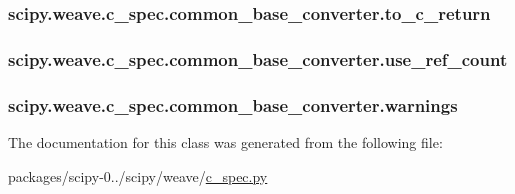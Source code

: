 \subsubsection[{to\+\_\+c\+\_\+return}]{\setlength{\rightskip}{0pt plus 5cm}scipy.\+weave.\+c\+\_\+spec.\+common\+\_\+base\+\_\+converter.\+to\+\_\+c\+\_\+return}\label{classscipy_1_1weave_1_1c__spec_1_1common__base__converter_a0b27e2332e5a6489410e44a73b781f91}
\hypertarget{classscipy_1_1weave_1_1c__spec_1_1common__base__converter_a043989ff4e9f8e6675d3692bfbddc76f}{}
\subsubsection[{use\+\_\+ref\+\_\+count}]{\setlength{\rightskip}{0pt plus 5cm}scipy.\+weave.\+c\+\_\+spec.\+common\+\_\+base\+\_\+converter.\+use\+\_\+ref\+\_\+count}\label{classscipy_1_1weave_1_1c__spec_1_1common__base__converter_a043989ff4e9f8e6675d3692bfbddc76f}
\hypertarget{classscipy_1_1weave_1_1c__spec_1_1common__base__converter_a545d2128e02f6254bdf5d73c39281616}{}
\subsubsection[{warnings}]{\setlength{\rightskip}{0pt plus 5cm}scipy.\+weave.\+c\+\_\+spec.\+common\+\_\+base\+\_\+converter.\+warnings}\label{classscipy_1_1weave_1_1c__spec_1_1common__base__converter_a545d2128e02f6254bdf5d73c39281616}


The documentation for this class was generated from the following file\+:\begin{DoxyCompactItemize}
\item 
packages/scipy-\/0../scipy/weave/\hyperlink{c__spec_8py}{c\+\_\+spec.\+py}\end{DoxyCompactItemize}
